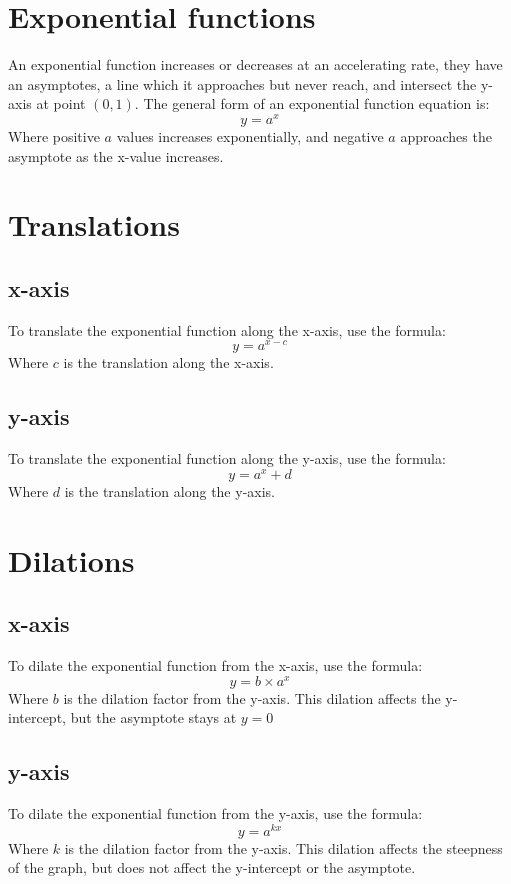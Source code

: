 \documentclass{book}
\begin{document}
\chapter{Exponential functions}
An exponential function increases or decreases at an accelerating rate, they have an asymptotes, a line which it approaches but never reach, and intersect the y-axis at point $(0, 1)$.  The general form of an exponential function equation is:
\[
	y = a^x
\]
Where positive $a$ values increases exponentially, and negative $a$ approaches the asymptote as the x-value increases.

\chapter{Translations}
\section{x-axis}
To translate the exponential function along the x-axis, use the formula:
\[
	y = a^{x - c}
\]
Where $c$ is the translation along the x-axis.\\

\section{y-axis}
To translate the exponential function along the y-axis, use the formula:
\[
	y = a^x + d
\]
Where $d$ is the translation along the y-axis.

\chapter{Dilations}
\section{x-axis}
To dilate the exponential function from the x-axis, use the formula:
\[
	y = b \times a^x
\]
Where $b$ is the dilation factor from the y-axis.  This dilation affects the y-intercept, but the asymptote stays at $y = 0$\\

\section{y-axis}
To dilate the exponential function from the y-axis, use the formula:
\[
	y = a^{kx}
\]
Where $k$ is the dilation factor from the y-axis.  This dilation affects the steepness of the graph, but does not affect the y-intercept or the asymptote.
\end{document}
